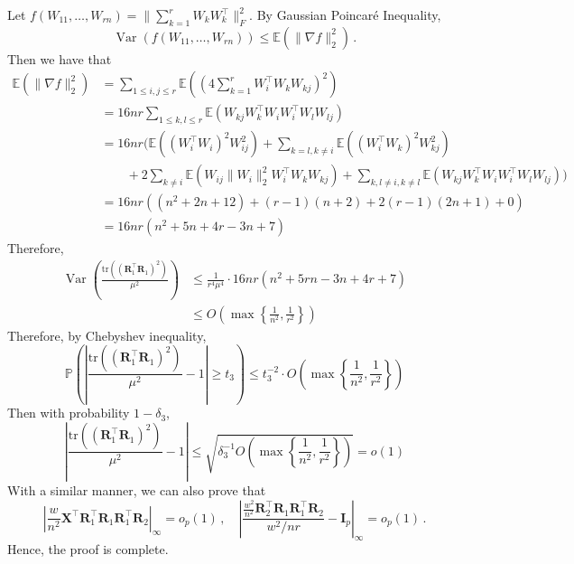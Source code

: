 \documentclass[11pt]{article}
\DeclareMathOperator{\Var}{Var}
\newcommand{\bX}{\boldsymbol{X}}
\newcommand{\bI}{\boldsymbol{I}}
\newcommand{\bR}{\boldsymbol{R}}
\newcommand{\Expected}{\mathbb{E}}
\newcommand{\Prob}{\mathbb{P}}
\begin{document}
Let $f(W_{11},\dotsc,W_{rn})=\|\sum_{k=1}^rW_kW_k^\top\|_F^2$. By Gaussian Poincaré Inequality, 
\[
\Var(f(W_{11},\dotsc,W_{rn}))\leq \Expected\left(\|\nabla f\|_2^2\right)\,.
\]
Then we have that
\begin{align*}
    \Expected\left(\|\nabla f\|_2^2\right) &= \sum_{1\le i, j\le r}\Expected \left(\left(4\sum_{k=1}^rW_i^\top W_k W_{kj}\right)^2 \right)\\
        &= 16nr\sum_{1\le k,l\le r}\Expected\left(W_{kj}W_k^\top W_iW_i^\top W_lW_{lj}\right)\\
        &= 16nr\bigg(\Expected\left(\left(W_i^\top W_i\right)^2W_{ij}^2\right)+\sum_{k=l,k\neq i}\Expected\left(\left(W_i^\top W_k\right)^2W_{kj}^2\right)\\
        &\quad\quad+2\sum_{k\neq i}\Expected\left(W_{ij}\|W_i\|_2^2W_i^\top W_k W_{kj}\right) +\sum_{k,l\neq i,k\neq l}\Expected\left(W_{kj}W_k^\top W_iW_i^\top W_l W_{lj}\right)\bigg)\\
        &=16nr\left((n^2+2n+12)+(r-1)(n+2)+2(r-1)(2n+1)+0\right)\\
        &=16nr\left(n^2+5n+4r-3n+7\right)
\end{align*}
Therefore, 
\begin{align*}
    \Var\left(\frac{\mbox{tr}((\bR_1^\top \bR_1)^2)}{\mu^2}\right)&\le \frac{1}{r^4\mu^4}\cdot 16nr(n^2+5rn-3n+4r+7)\\
    &\le O\left(\max\left\{\frac{1}{n^2},\frac{1}{r^2}\right\}\right)
\end{align*}
Therefore, by Chebyshev inequality,
\[
\Prob\left(\left|\frac{\mbox{tr}((\bR_1^\top\bR_1)^2)}{\mu^2}-1\right|\ge t_3\right)\le t_3^{-2}\cdot O\left(\max\left\{\frac{1}{n^2},\frac{1}{r^2}\right\}\right)
\]
Then with probability $1-\delta_3$, 
\[
\left|\frac{\mbox{tr}((\bR_1^\top\bR_1)^2)}{\mu^2}-1\right|\le \sqrt{\delta_3^{-1}O\left(\max\left\{\frac{1}{n^2},\frac{1}{r^2}\right\}\right)}=o(1)
\]
With a similar manner, we can also prove that 
\[
\left|\frac{w}{n^2}\bX^\top\bR_1^\top\bR_1\bR_1^\top\bR_2\right|_\infty=o_p(1)\,,\quad \left|\frac{\frac{w^2}{n^2}\bR_2^\top\bR_1\bR_1^\top\bR_2}{w^2/nr}-\bI_p\right|_\infty=o_p(1)\,.
\]
Hence, the proof is complete.

\end{document}
